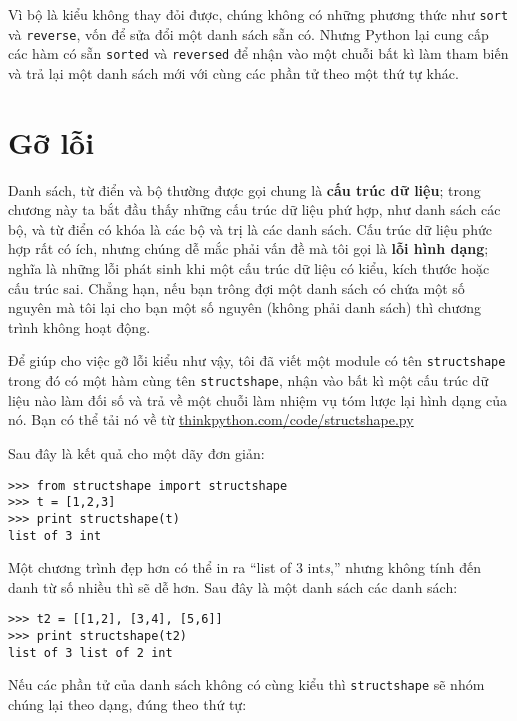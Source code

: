 \documentclass[11pt]{book}
\begin{document}
Vì bộ là kiểu không thay đỏi được, chúng không có những phương thức 
như {\tt sort} và {\tt reverse}, vốn để sửa đổi một danh sách sẵn có.
Nhưng Python lại cung cấp các hàm có sẵn {\tt sorted}
và {\tt reversed} để nhận vào một chuỗi bất kì làm tham biến và
trả lại một danh sách mới với cùng các phần tử theo một thứ tự khác.



\section{Gỡ lỗi}


Danh sách, từ điển và bộ thường được gọi chung là  {\bf cấu trúc 
dữ liệu}; trong chương này ta bắt đầu thấy những cấu trúc dữ liệu
phứ hợp, như danh sách các bộ, và từ điển có khóa là các bộ và trị là
các danh sách. Cấu trúc dữ liệu phức hợp rất có ích, nhưng chúng dễ
mắc phải vấn đề mà tôi gọi là {\bf lỗi hình dạng}; nghĩa là những lỗi
phát sinh khi một cấu trúc dữ liệu có kiểu, kích thước hoặc cấu trúc sai.
Chẳng hạn, nếu bạn trông đợi một danh sách có chứa một số nguyên mà tôi lại
cho bạn một số nguyên (không phải danh sách) thì chương trình không hoạt động.


Để giúp cho việc gỡ lỗi kiểu như vậy, tôi đã viết một module
có tên {\tt structshape} trong đó có một hàm cùng tên
{\tt structshape}, nhận vào bất kì một cấu trúc dữ liệu nào làm đối số và
trả về một chuỗi làm nhiệm vụ tóm lược lại hình dạng của nó.
Bạn có thể tải nó về từ \url{thinkpython.com/code/structshape.py}

Sau đây là kết quả cho một dãy đơn giản:

\beforeverb
\begin{verbatim}
>>> from structshape import structshape
>>> t = [1,2,3]
>>> print structshape(t)
list of 3 int
\end{verbatim}
\afterverb
%
Một chương trình đẹp hơn có thể in ra ``list of 3 int{\em s},'' nhưng
không tính đến danh từ số nhiều thì sẽ dễ hơn. Sau đây là một
danh sách các danh sách:

\beforeverb
\begin{verbatim}
>>> t2 = [[1,2], [3,4], [5,6]]
>>> print structshape(t2)
list of 3 list of 2 int
\end{verbatim}
\afterverb
%
Nếu các phần tử của danh sách không có cùng kiểu thì
{\tt structshape} sẽ nhóm chúng lại theo dạng, đúng theo
thứ tự:
\end{document}
